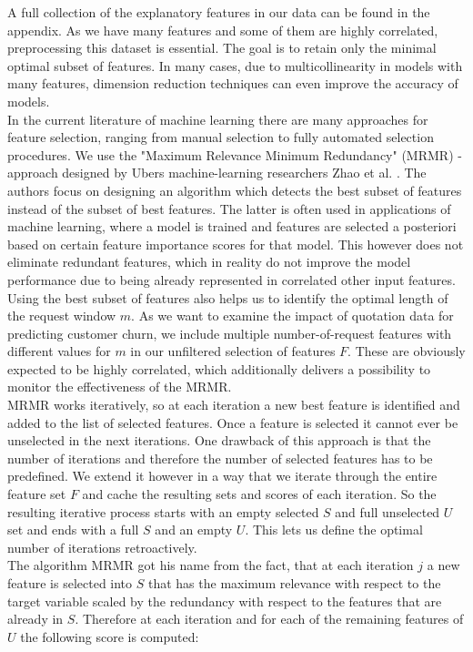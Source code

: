 \documentclass[12pt,titlepage]{article}
\begin{document}
A full collection of the explanatory features in our data can be found in the appendix. As we have many features and some of them are highly correlated, preprocessing this dataset is essential. The goal is to retain only the minimal optimal subset of features. In many cases, due to multicollinearity in models with many features, dimension reduction techniques can even improve the accuracy of models. \\
In the current literature of machine learning there are many approaches for feature selection, ranging from manual selection to fully automated selection procedures. We use the "Maximum Relevance Minimum Redundancy" (MRMR) - approach designed by Ubers machine-learning researchers Zhao et al. \cite{mrmr}. The authors focus on designing an algorithm which detects the best subset of features instead of the subset of best features. The latter is often used in applications of machine learning, where a model is trained and features are selected a posteriori based on certain feature importance scores for that model. This however does not eliminate redundant features, which in reality do not improve the model performance due to being already represented in correlated other input features. \\
Using the best subset of features also helps us to identify the optimal length of the request window $m$. As we want to examine the impact of quotation data for predicting customer churn, we include multiple number-of-request features with different values for $m$ in our unfiltered selection of features $F$. These are obviously expected to be highly correlated, which additionally delivers a possibility to monitor the effectiveness of the MRMR. \\
MRMR works iteratively, so at each iteration a new best feature is identified and added to the list of selected features. Once a feature is selected it cannot ever be unselected in the next iterations. One drawback of this approach is that the number of iterations and therefore the number of selected features has to be predefined. We extend it however in a way that we iterate through the entire feature set $F$ and cache the resulting sets and scores of each iteration. So the resulting iterative process starts with an empty selected $S$ and full unselected $U$ set and ends with a full $S$ and an empty $U$. This lets us define the optimal number of iterations retroactively. \\
The algorithm MRMR got his name from the fact, that at each iteration $j$ a new feature is selected into $S$ that has the maximum relevance with respect to the target variable scaled by the redundancy with respect to the features that are already in $S$. Therefore at each iteration and for each of the remaining features of $U$ the following score is computed: \\
\end{document}
